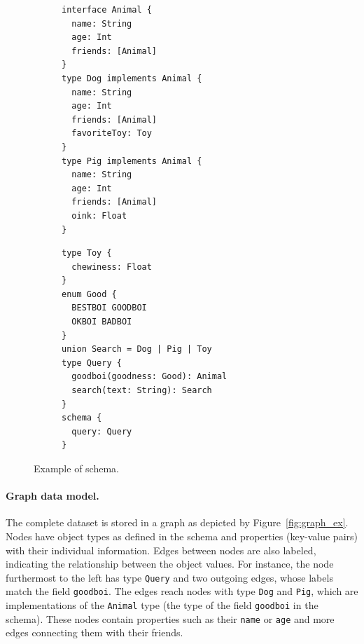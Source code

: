 \begin{figure}
    \centering
    \begin{subfigure}{.5\linewidth}
    
    \begin{verbatim}
interface Animal {		
  name: String
  age: Int
  friends: [Animal]
}
type Dog implements Animal {
  name: String
  age: Int
  friends: [Animal]
  favoriteToy: Toy
}
type Pig implements Animal {
  name: String
  age: Int
  friends: [Animal]
  oink: Float
}
    \end{verbatim}
    \end{subfigure}%
    \begin{subfigure}{.5\linewidth}
    \begin{verbatim}
type Toy {
  chewiness: Float
}
enum Good { 
  BESTBOI GOODBOI 
  OKBOI BADBOI 
}
union Search = Dog | Pig | Toy
type Query {
  goodboi(goodness: Good): Animal
  search(text: String): Search
}
schema {
  query: Query
}
    \end{verbatim}
    \end{subfigure}
    
    \caption{Example of \gql schema.}
    \label{fig:schema_ex}
\end{figure}


\paragraph{Graph data model.}

The complete \goodbois dataset is stored in a graph as depicted by Figure~\ref{fig:graph_ex}. 
Nodes have object types as defined in the schema and properties (key-value pairs) with their individual information.
Edges between nodes are also labeled, indicating the relationship between the object values. For instance, the node 
furthermost to the left has type \texttt{Query} and two outgoing edges, whose labels match the field \texttt{goodboi}.
The edges reach nodes with type \texttt{Dog} and \texttt{Pig}, which are implementations of the \texttt{Animal} type (the type of the field \texttt{goodboi} in the schema).
These nodes contain properties such as their \texttt{name} or \texttt{age} and more edges connecting them with 
their friends.


